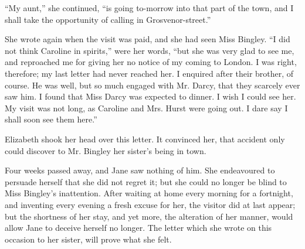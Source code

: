 “My aunt,” she continued, “is going to-morrow into
that part of the town, and I shall take the opportunity
of calling in Grosvenor-street.”

She wrote again when the visit was paid, and she had
seen Miss Bingley. “I did not think Caroline in spirits,”
were her words, “but she was very glad to see me, and
reproached me for giving her no notice of my coming to
London. I was right, therefore; my last letter had never
reached her. I enquired after their brother, of course.
He was well, but so much engaged with Mr. Darcy, that
they scarcely ever saw him. I found that Miss Darcy
was expected to dinner. I wish I could see her. My
visit was not long, as Caroline and Mrs. Hurst were going
out. I dare say I shall soon see them here.”

Elizabeth shook her head over this letter. It convinced
her, that accident only could discover to Mr.
Bingley her sister’s being in town.

Four weeks passed away, and Jane saw nothing of him.
She endeavoured to persuade herself that she did not
regret it; but she could no longer be blind to Miss Bingley’s
inattention. After waiting at home every morning for
a fortnight, and inventing every evening a fresh excuse
for her, the visitor did at last appear; but the shortness
of her stay, and yet more, the alteration of her manner,
would allow Jane to deceive herself no longer. The letter
which she wrote on this occasion to her sister, will prove
what she felt.

